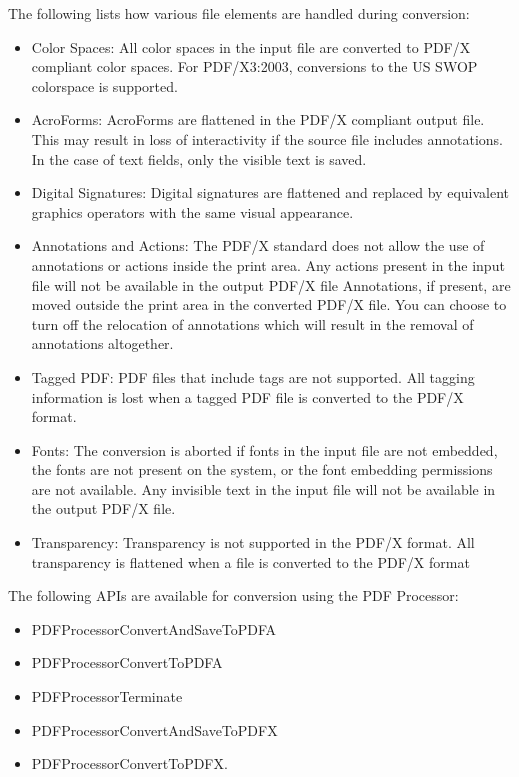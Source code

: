 \documentclass[letterpaper,12pt,english,openany,oneside]{sphinxmanual}
\begin{document}
The following lists how various file elements are handled during conversion:
\begin{itemize}
\item {} 
Color Spaces: All color spaces in the input file are converted to PDF/X compliant color spaces. For PDF/X\sphinxhyphen{}3:2003, conversions to the US SWOP colorspace is supported.

\item {} 
AcroForms: AcroForms are flattened in the PDF/X compliant output file. This may result in loss of interactivity if the source file includes annotations. In the case of text fields, only the visible text is saved.

\item {} 
Digital Signatures: Digital signatures are flattened and replaced by equivalent graphics operators with the same visual appearance.

\item {} 
Annotations and Actions: The PDF/X standard does not allow the use of annotations or actions inside the print area. Any actions present in the input file will not be available in the output PDF/X file Annotations, if present, are moved outside the print area in the converted PDF/X file. You can choose to turn off the relocation of annotations which will result in the removal of annotations altogether.

\item {} 
Tagged PDF: PDF files that include tags are not supported. All tagging information is lost when a tagged PDF file is converted to the PDF/X format.

\item {} 
Fonts: The conversion is aborted if fonts in the input file are not embedded, the fonts are not present on the system, or the font embedding permissions are not available. Any invisible text in the input file will not be available in the output PDF/X file.

\item {} 
Transparency: Transparency is not supported in the PDF/X format. All transparency is flattened when a file is converted to the PDF/X format

\end{itemize}

The following APIs are available for conversion using the PDF Processor:
\begin{itemize}
\item {} 
PDFProcessorConvertAndSaveToPDFA

\item {} 
PDFProcessorConvertToPDFA

\item {} 
PDFProcessorTerminate

\item {} 
PDFProcessorConvertAndSaveToPDFX

\item {} 
PDFProcessorConvertToPDFX.

\end{itemize}
\end{document}
